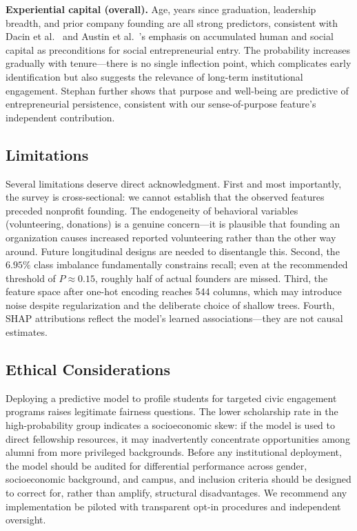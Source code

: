\documentclass[10pt,twocolumn]{article}
\begin{document}
\textbf{Experiential capital (overall).} Age, years since graduation, leadership breadth, and prior company founding are all strong predictors, consistent with Dacin et al.\ \cite{sullivan2021} and Austin et al.\ \cite{modem2021}'s emphasis on accumulated human and social capital as preconditions for social entrepreneurial entry. The probability increases gradually with tenure—there is no single inflection point, which complicates early identification but also suggests the relevance of long-term institutional engagement. Stephan \cite{udayar2025} further shows that purpose and well-being are predictive of entrepreneurial persistence, consistent with our sense-of-purpose feature's independent contribution.

\subsection{Limitations}

Several limitations deserve direct acknowledgment. First and most importantly, the survey is cross-sectional: we cannot establish that the observed features preceded nonprofit founding. The endogeneity of behavioral variables (volunteering, donations) is a genuine concern—it is plausible that founding an organization causes increased reported volunteering rather than the other way around. Future longitudinal designs are needed to disentangle this. Second, the $6.95\%$ class imbalance fundamentally constrains recall; even at the recommended threshold of $P \approx 0.15$, roughly half of actual founders are missed. Third, the feature space after one-hot encoding reaches 544 columns, which may introduce noise despite regularization and the deliberate choice of shallow trees. Fourth, SHAP attributions reflect the model's learned associations—they are not causal estimates.

\subsection{Ethical Considerations}

Deploying a predictive model to profile students for targeted civic engagement programs raises legitimate fairness questions. The lower scholarship rate in the high-probability group indicates a socioeconomic skew: if the model is used to direct fellowship resources, it may inadvertently concentrate opportunities among alumni from more privileged backgrounds. Before any institutional deployment, the model should be audited for differential performance across gender, socioeconomic background, and campus, and inclusion criteria should be designed to correct for, rather than amplify, structural disadvantages. We recommend any implementation be piloted with transparent opt-in procedures and independent oversight.
\end{document}
